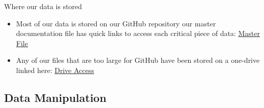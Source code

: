 \documentclass[12pt]{article}
\begin{document}
\noindent Where our data is stored
\begin{itemize}
    \item Most of our data is stored on our GitHub repository our master documentation file has quick links to access each critical piece of data: \href{https://github.com/ecn310/course-project-zipcentercrime/blob/main/Master%20Documentation%20File.md}{Master File}
     \item Any of our files that are too large for GitHub have been stored on a one-drive linked here: \href{https://sumailsyr-my.sharepoint.com/:f:/r/personal/wrmaechl_syr_edu/Documents/ZipCenterCrime?csf=1&web=1&e=IK0GWY}{Drive Access}
\end{itemize}


\subsection{Data Manipulation}
\label{sec:data}
\end{document}

